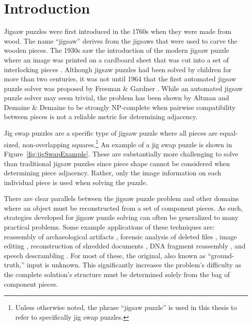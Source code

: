 \chapter{Introduction}\label{sec:introduction}

Jigsaw puzzles were first introduced in the 1760s when they were made from wood.  The name ``jigsaw'' derives from the jigsaws that were used to carve the wooden pieces.   The 1930s saw the introduction of the modern jigsaw puzzle where an image was printed on a cardboard sheet that was cut into a set of interlocking pieces \cite{williams1990, williams2004}.  Although jigsaw puzzles had been solved by children for more than two centuries, it was not until 1964 that the first automated jigsaw puzzle solver was proposed by Freeman \& Gardner \cite{freeman1964}.  While an automated jigsaw puzzle solver may seem trivial, the problem has been shown by Altman \cite{altman1990} and Demaine \& Demaine \cite{demaine2007} to be strongly NP-complete when pairwise compatibility between pieces is not a reliable metric for determining adjacency.

Jig swap puzzles are a specific type of jigsaw puzzle where all pieces are equal-sized, non-overlapping squares.\footnote{Unless otherwise noted, the phrase ``jigsaw puzzle'' is used in this thesis to refer to specifically jig swap puzzles.}  An example of a jig swap puzzle is shown in Figure~\ref{fig:jigSwapExample}.  These are substantially more challenging to solve than traditional jigsaw puzzles since piece shape cannot be considered when determining piece adjacency.  Rather, only the image information on each individual piece is used when solving the puzzle.

There are clear parallels between the jigsaw puzzle problem and other domains where an object must be reconstructed from a set of component pieces.  As such, strategies developed for jigsaw puzzle solving can often be generalized to many practical problems.  Some example applications of these techniques are: reassembly of archaeological artifacts \cite{brown2008, koller2006}, forensic analysis of deleted files \cite{garfinkel2010}, image editing \cite{cho2008}, reconstruction of shredded documents \cite{zhu2008}, DNA fragment reassembly \cite{marande2007}, and speech descrambling \cite{zhao2007}.  For most of these, the original, also known as ``ground-truth,'' input is unknown.  This significantly increases the problem's difficulty as the complete solution's structure must be determined solely from the bag of component pieces.

